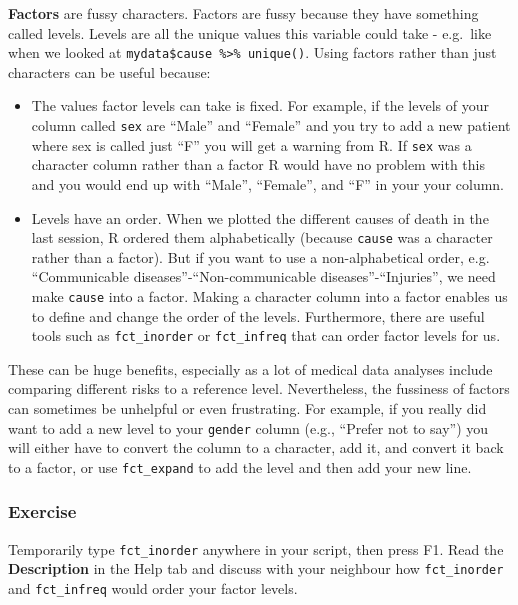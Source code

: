 \documentclass[]{book}
\providecommand{\tightlist}{%
  \setlength{\itemsep}{0pt}\setlength{\parskip}{0pt}}
\begin{document}
\textbf{Factors} are fussy characters. Factors are fussy because they
have something called levels. Levels are all the unique values this
variable could take - e.g.~like when we looked at
\texttt{mydata\$cause\ \%\textgreater{}\%\ unique()}. Using factors
rather than just characters can be useful because:

\begin{itemize}
\tightlist
\item
  The values factor levels can take is fixed. For example, if the levels
  of your column called \texttt{sex} are ``Male'' and ``Female'' and you
  try to add a new patient where sex is called just ``F'' you will get a
  warning from R. If \texttt{sex} was a character column rather than a
  factor R would have no problem with this and you would end up with
  ``Male'', ``Female'', and ``F'' in your your column.
\item
  Levels have an order. When we plotted the different causes of death in
  the last session, R ordered them alphabetically (because
  \texttt{cause} was a character rather than a factor). But if you want
  to use a non-alphabetical order, e.g. ``Communicable
  diseases''-``Non-communicable diseases''-``Injuries'', we need make
  \texttt{cause} into a factor. Making a character column into a factor
  enables us to define and change the order of the levels. Furthermore,
  there are useful tools such as \texttt{fct\_inorder} or
  \texttt{fct\_infreq} that can order factor levels for us.
\end{itemize}

These can be huge benefits, especially as a lot of medical data analyses
include comparing different risks to a reference level. Nevertheless,
the fussiness of factors can sometimes be unhelpful or even frustrating.
For example, if you really did want to add a new level to your
\texttt{gender} column (e.g., ``Prefer not to say'') you will either
have to convert the column to a character, add it, and convert it back
to a factor, or use \texttt{fct\_expand} to add the level and then add
your new line.

\subsubsection{Exercise}\label{exercise-8}

Temporarily type \texttt{fct\_inorder} anywhere in your script, then
press F1. Read the \textbf{Description} in the Help tab and discuss with
your neighbour how \texttt{fct\_inorder} and \texttt{fct\_infreq} would
order your factor levels.
\end{document}

